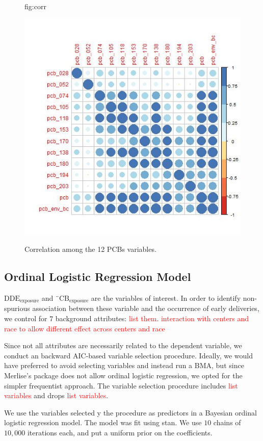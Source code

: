 \documentclass[wcp]{jmlr}%
\newcommand\todo[1]{\textcolor{red}{#1}}
\begin{document}
\begin{figure}[htbp]
	\floatconts
	{fig:corr}
	{\caption{Correlation among the 12 PCBs variables.}}
	{\includegraphics[width=0.8\linewidth]{pcb_corr}}
\end{figure}

\subsection{Ordinal Logistic Regression Model}
$\text{DDE}_{\text{exposure}}$ and $\text{¨CB}_{\text{exposure}}$ are the variables of interest. In order to identify non-spurious association between these variable and the occurrence of early deliveries, we control for $7$ background attributes: \todo{list them}.
\todo{interaction with centers and race to allow different effect across centers and race}

Since not all attributes are necessarily related to the dependent variable, we conduct an backward AIC-based variable selection procedure. Ideally, we would have preferred to avoid selecting variables and instead run a BMA, but since Merlise's package does not allow ordinal logistic regression, we opted for the simpler frequentist approach. The variable selection procedure includes \todo{list variables} and drops \todo{list variables}.

We use the variables selected y the procedure as predictors in a Bayesian ordinal logistic regression model. The model was fit using stan. We use $10$ chains of $10,000$ iterations each, and put a uniform prior on the coefficients.
\end{document}
